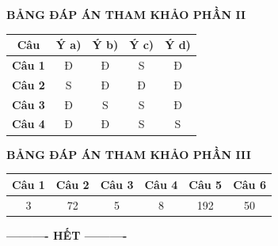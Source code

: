 \documentclass[12pt,a4paper]{article}
\begin{document}
\bigskip
\noindent\textbf{\large BẢNG ĐÁP ÁN THAM KHẢO PHẦN II}
\vspace{0.2cm}

\begin{center}
\begin{tabular}{|c|c|c|c|c|}
\hline
\textbf{Câu} & \textbf{Ý a)} & \textbf{Ý b)} & \textbf{Ý c)} & \textbf{Ý d)} \\
\hline
\textbf{Câu 1} & Đ & Đ & S & Đ \\
\hline
\textbf{Câu 2} & S & Đ & Đ & Đ \\
\hline
\textbf{Câu 3} & Đ & S & S & Đ \\
\hline
\textbf{Câu 4} & Đ & Đ & S & S \\
\hline
\end{tabular}
\end{center}

\bigskip
\noindent\textbf{\large BẢNG ĐÁP ÁN THAM KHẢO PHẦN III}
\vspace{0.2cm}

\begin{center}
\begin{tabular}{|c|c|c|c|c|c|}
\hline
\textbf{Câu 1} & \textbf{Câu 2} & \textbf{Câu 3} & \textbf{Câu 4} & \textbf{Câu 5} & \textbf{Câu 6} \\
\hline
3 & 72 & 5 & 8 & 192 & 50 \\
\hline
\end{tabular}
\end{center}

\bigskip
\begin{center}
\textbf{---------- HẾT ----------}
\end{center}
\end{document}

